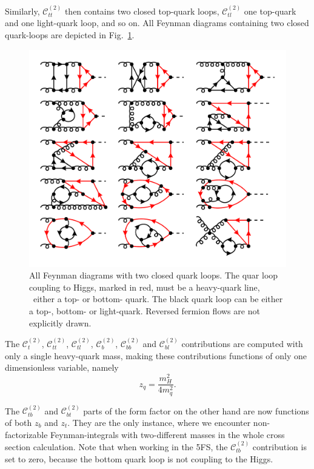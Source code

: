 Similarly, $\mathcal{C}_{tt}^{(2)}$ then contains two closed top-quark loops, $\mathcal{C}_{tl}^{(2)}$ one top-quark and one light-quark loop, and so on. All Feynman diagrams containing two closed quark-loops are depicted in Fig.~\ref{fig:5:C_tt}.
%
\begin{figure}[h]
\centering
\includegraphics[width=\figurewidth]{Images/NNLO_Feynman_diagrams/C_tt.pdf}
\caption{All Feynman diagrams with two closed quark loops. The quar loop coupling to Higgs, marked in red, must be a heavy-quark line, \ie\ either a top- or bottom- quark. The black quark loop can be either a top-, bottom- or light-quark. Reversed fermion flows are not explicitly drawn.}
\label{fig:5:C_tt}
\end{figure}
The $\mathcal{C}_t^{(2)}$, $\mathcal{C}_{tt}^{(2)}$, $\mathcal{C}_{tl}^{(2)}$, $\mathcal{C}_b^{(2)}$, $\mathcal{C}_{bb}^{(2)}$ and $\mathcal{C}_{bl}^{(2)}$ contributions are computed with only a single heavy-quark mass, making these contributions functions of only one dimensionless variable, namely
\begin{equation}
z_q = \frac{m_H^2}{4 m_q^2}.
\end{equation}

The $\mathcal{C}_{tb}^{(2)}$ and $\mathcal{C}_{bt}^{(2)}$ parts of the form factor on the other hand are now functions of both $z_b$ and $z_t$. They are the only instance, where we encounter non-factorizable Feynman-integrals with two-different masses in the whole cross section calculation. Note that when working in the 5\acs{FS}, the $\mathcal{C}_{tb}^{(2)}$ contribution is set to zero, because the bottom quark loop is not coupling to the Higgs.

